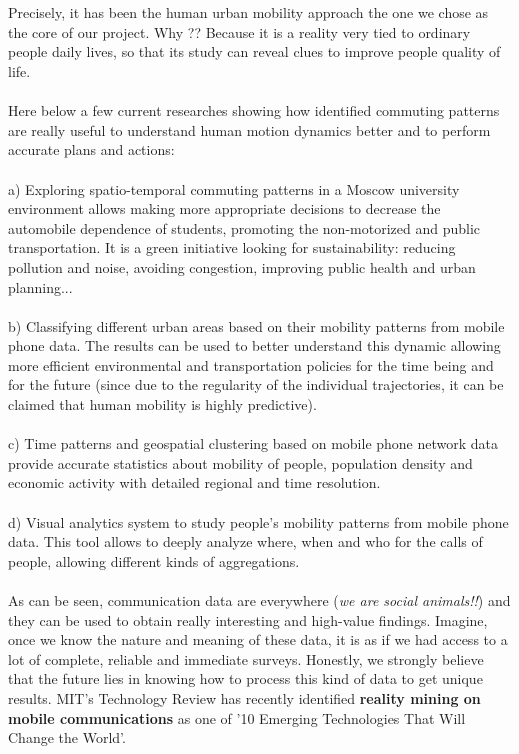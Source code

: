 \\
\\
Precisely, it has been the human urban mobility approach the one we chose as the core of our project. Why ?? Because it is a reality very tied to ordinary people daily lives, so that its study can reveal clues to improve people quality of life.
\\
\\
Here below a few current researches showing how identified commuting patterns are really useful to understand human motion dynamics better and to perform accurate plans and actions:
\\
\\
a) Exploring spatio-temporal commuting patterns in a Moscow university environment allows making more appropriate decisions to decrease the automobile dependence of students, promoting the non-motorized and public transportation. It is a green initiative looking for sustainability: reducing pollution and noise, avoiding congestion, improving public health and urban planning...
\\
\\
b) Classifying different urban areas based on their mobility patterns from mobile phone data. The results can be used to better understand this dynamic allowing more efficient environmental and transportation policies for the time being and for the future (since due to the regularity of the individual trajectories, it can be claimed that human mobility is highly predictive).
\\
\\
c) Time patterns and geospatial clustering based on mobile phone network data provide accurate statistics about mobility of people, population density and economic activity with detailed regional and time resolution.
\\
\\
d) Visual analytics system to study people's mobility patterns from mobile phone data. This tool allows to deeply analyze where, when and who for the calls of  people, allowing different kinds of aggregations.
\\
\\
As can be seen, communication data are everywhere ({\it we are social animals!!}) and they can be used to obtain really interesting and high-value findings. Imagine, once we know the nature and meaning of these data, it is as if we had access to a lot of complete, reliable and immediate surveys. Honestly, we strongly believe that the future lies in knowing how to process this kind of data to get unique results. MIT's Technology Review has recently identified {\bf reality mining on mobile communications} as one of '10 Emerging Technologies That Will Change the World'.
